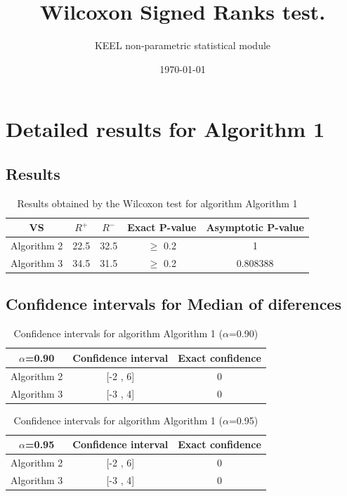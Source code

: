 \documentclass[a4paper,10pt]{article}
\title{Wilcoxon Signed Ranks test.}
\date{\today}
\author{KEEL non-parametric statistical module}
\begin{document}
\pagestyle{empty}
\maketitle
\thispagestyle{empty}



\section{Detailed results for Algorithm 1}


\subsection{Results}

\begin{table}[!htp]
\centering\small
\begin{tabular}{
|c|c|c|c|c|}
\hline
 VS & $R^{+}$ & $R^{-}$ & Exact P-value & Asymptotic P-value \\ \hline 
Algorithm 2 & 22.5 & 32.5 & $\geq$ 0.2 & 1\\ \hline 
Algorithm 3 & 34.5 & 31.5 & $\geq$ 0.2 & 0.808388\\ \hline 

\end{tabular}
\caption{Results obtained by the Wilcoxon test for algorithm Algorithm 1}
\end{table}

\subsection{Confidence intervals for Median of diferences}

\begin{table}[!htp]
\centering\small
\begin{tabular}{
|c|c|c|}
\hline
 $\alpha$=0.90 & Confidence interval & Exact confidence \\ \hline 
Algorithm 2 & [-2 , 6] & 0\\ \hline 
Algorithm 3 & [-3 , 4] & 0\\ \hline 

\end{tabular}
\caption{Confidence intervals for algorithm Algorithm 1 ($\alpha$=0.90)}
\end{table}
\begin{table}[!htp]
\centering\small
\begin{tabular}{
|c|c|c|}
\hline
 $\alpha$=0.95 & Confidence interval & Exact confidence \\ \hline 
Algorithm 2 & [-2 , 6] & 0\\ \hline 
Algorithm 3 & [-3 , 4] & 0\\ \hline 

\end{tabular}
\caption{Confidence intervals for algorithm Algorithm 1 ($\alpha$=0.95)}
\end{table}
\end{document}
